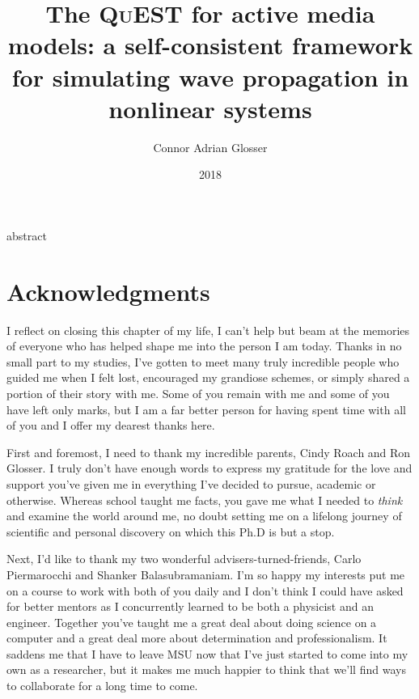 \documentclass[mixedtoc]{msu-thesis-custom}
\title{The \textsc{QuEST} for active media models: a self-consistent framework for simulating wave propagation in nonlinear systems}
\author{Connor Adrian Glosser}
\date{2018}
\begin{document}
\frontmatter
\maketitlepage

{abstract}

\clearpage

\makecopyrightpage


\makededicationpage

\clearpage
\chapter*{Acknowledgments}
\DoubleSpacing %
 I reflect on closing this chapter of my life, I can't help but
beam at the memories of everyone who has helped shape me into the person I am
today. Thanks in no small part to my studies, I've gotten to meet many truly
incredible people who guided me when I felt lost, encouraged my grandiose
schemes, or simply shared a portion of their story with me. Some of you remain
with me and some of you have left only marks, but I am a far better person for
having spent time with all of you and I offer my dearest thanks here.

First and foremost, I need to thank my incredible parents, Cindy Roach and Ron
Glosser. I truly don't have enough words to express my gratitude for the love
and support you've given me in everything I've decided to pursue, academic or
otherwise.  Whereas school taught me facts, you gave me what I needed to
\emph{think} and examine the world around me, no doubt setting me on a lifelong
journey of scientific and personal discovery on which this Ph.D is but a stop.

Next, I'd like to thank my two wonderful advisers-turned-friends, Carlo
Piermarocchi and Shanker Balasubramaniam.  I'm so happy my interests put me on
a course to work with both of you daily and I don't think I could have asked
for better mentors as I concurrently learned to be both a physicist and an
engineer. Together you've taught me a great deal about doing science on a
computer and a great deal more about determination and professionalism. It
saddens me that I have to leave MSU now that I've just started to come into my
own as a researcher, but it makes me much happier to think that we'll find ways
to collaborate for a long time to come.
\end{document}
